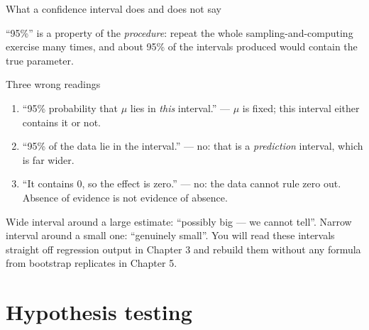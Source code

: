 \documentclass[aspectratio=169,11pt]{beamer}
\begin{document}
\begin{frame}{What a confidence interval does and does not say}\label{frm:cimeaning}
  \footnotesize
  \begin{readme}
    ``95\%'' is a property of the \emph{procedure}: repeat the whole
    sampling-and-computing exercise many times, and about 95\% of the
    intervals produced would contain the true parameter.
  \end{readme}
  \begin{alertblock}{Three wrong readings}
    \begin{enumerate}
      \item ``95\% probability that $\mu$ lies in \emph{this} interval.'' ---
            $\mu$ is fixed; this interval either contains it or not.
      \item ``95\% of the data lie in the interval.'' --- no: that is a
            \emph{prediction} interval, which is far wider.
      \item ``It contains 0, so the effect is zero.'' --- no: the data cannot
            rule zero out. Absence of evidence is not evidence of absence.
    \end{enumerate}
  \end{alertblock}
  \begin{takeaway}
    Wide interval around a large estimate: ``possibly big --- we cannot tell''.
    Narrow interval around a small one: ``genuinely small''. You will read
    these intervals straight off regression output in Chapter 3 and rebuild
    them without any formula from bootstrap replicates in Chapter 5.
  \end{takeaway}
\end{frame}


\section[Testing]{Hypothesis testing}
\end{document}
